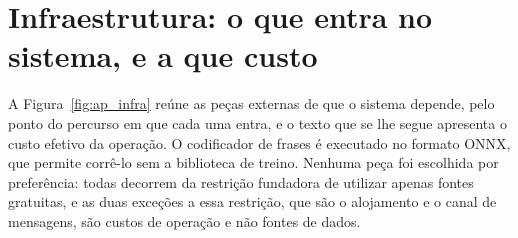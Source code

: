 \section{Infraestrutura: o que entra no sistema, e a que custo}
\label{sec:ap_infra}

A Figura~\ref{fig:ap_infra} reúne as peças externas de que o sistema depende, pelo ponto do
percurso em que cada uma entra, e o texto que se lhe segue apresenta o custo efetivo da
operação. O codificador de frases é executado no formato \gls{ONNX}, que permite
corrê-lo sem a biblioteca de treino. Nenhuma peça foi escolhida por preferência: todas decorrem
da restrição fundadora de utilizar apenas fontes gratuitas, e as duas exceções a essa
restrição, que são o alojamento e o canal de mensagens, são custos de operação e não fontes de
dados.

